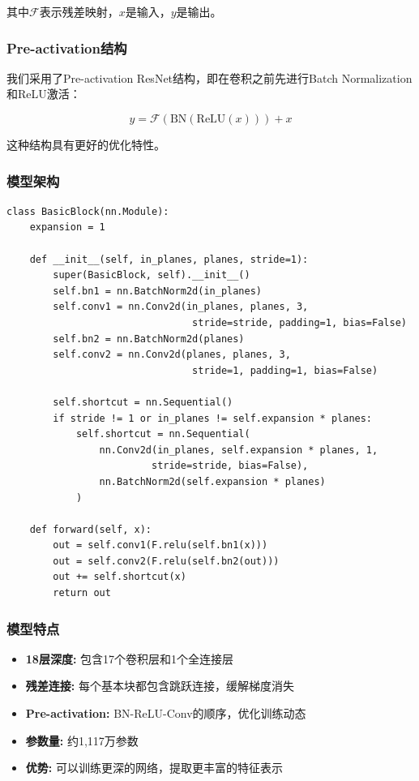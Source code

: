 \documentclass[12pt,a4paper]{article}
\begin{document}
其中$\mathcal{F}$表示残差映射，$x$是输入，$y$是输出。

\subsubsection{Pre-activation结构}

我们采用了Pre-activation ResNet结构，即在卷积之前先进行Batch Normalization和ReLU激活：

\begin{equation}
    y = \mathcal{F}(\text{BN}(\text{ReLU}(x))) + x
\end{equation}

这种结构具有更好的优化特性\cite{he2016identity}。

\subsubsection{模型架构}

\begin{lstlisting}[caption={ResNet-18基本模块},label={lst:resnet}]
class BasicBlock(nn.Module):
    expansion = 1
    
    def __init__(self, in_planes, planes, stride=1):
        super(BasicBlock, self).__init__()
        self.bn1 = nn.BatchNorm2d(in_planes)
        self.conv1 = nn.Conv2d(in_planes, planes, 3, 
                                stride=stride, padding=1, bias=False)
        self.bn2 = nn.BatchNorm2d(planes)
        self.conv2 = nn.Conv2d(planes, planes, 3, 
                                stride=1, padding=1, bias=False)
        
        self.shortcut = nn.Sequential()
        if stride != 1 or in_planes != self.expansion * planes:
            self.shortcut = nn.Sequential(
                nn.Conv2d(in_planes, self.expansion * planes, 1,
                         stride=stride, bias=False),
                nn.BatchNorm2d(self.expansion * planes)
            )
            
    def forward(self, x):
        out = self.conv1(F.relu(self.bn1(x)))
        out = self.conv2(F.relu(self.bn2(out)))
        out += self.shortcut(x)
        return out
\end{lstlisting}

\subsubsection{模型特点}

\begin{itemize}[leftmargin=2em]
    \item \textbf{18层深度:} 包含17个卷积层和1个全连接层
    \item \textbf{残差连接:} 每个基本块都包含跳跃连接，缓解梯度消失
    \item \textbf{Pre-activation:} BN-ReLU-Conv的顺序，优化训练动态
    \item \textbf{参数量:} 约1,117万参数
    \item \textbf{优势:} 可以训练更深的网络，提取更丰富的特征表示
\end{itemize}
\end{document}

